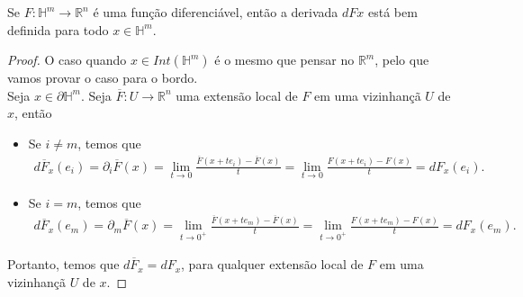 \begin{proposition}
  Se $F:\mathbb{H}^{m}\to\mathbb{R}^{n}$ é uma função diferenciável, então a derivada $dFx$ está bem definida para todo $x\in \mathbb{H}^{m}$. 
\end{proposition}
\begin{proof} 
  O caso quando $x\in Int(\mathbb{H}^{m})$ é o mesmo que pensar no $\mathbb{R}^{m}$, pelo que vamos provar o caso para o bordo.\\
  Seja $x\in\partial\mathbb{H}^{m}$. Seja $\overline{F}:U\to\mathbb{R}^{n}$ uma extensão local de $F$ em uma vizinhançã $U$ de $x$, então
  \begin{itemize}
    \item Se $i\neq m$, temos que
      \begin{align*}
        d\overline{F}_x(e_i)=\partial_i\overline{F}(x)=\lim_{t \to 0}\frac{\overline{F}(x+te_i)-\overline{F}(x)}{t}=\lim_{t \to 0}\frac{F(x+te_i)-F(x)}{t}=dF_x(e_i).
      \end{align*}
    \item Se $i=m$, temos que
      \begin{align*}
        d\overline{F}_x(e_m)=\partial_m\overline{F}(x)=\lim_{t \to 0^{+}}\frac{\overline{F}(x+te_m)-\overline{F}(x)}{t}=\lim_{t \to 0^{+}}\frac{F(x+te_m)-F(x)}{t}=dF_x(e_m).
      \end{align*}
  \end{itemize}
  Portanto, temos que $d\overline{F}_x=dF_x$, para qualquer extensão local de $F$ em uma vizinhançã $U$ de $x$. 
\end{proof}
